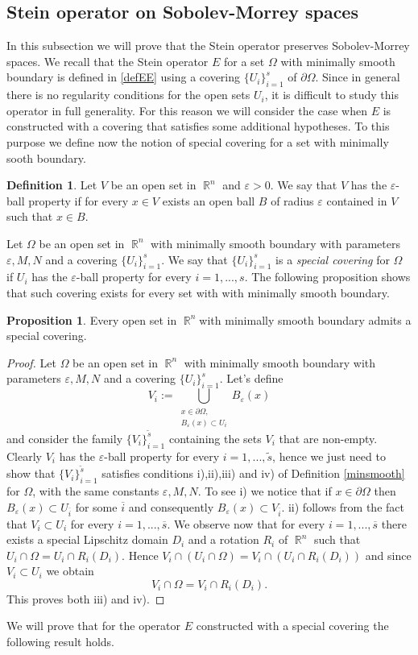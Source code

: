 \documentclass[12pt]{article}
\theoremstyle{definition}
\newtheorem{definition}{Definition}
\newtheorem{prop}{Proposition}
\DeclareMathOperator\rr{\mathbb{R}}
\begin{document}
\subsection{Stein operator on Sobolev-Morrey spaces}
In this subsection we will prove that the Stein operator preserves Sobolev-Morrey spaces. We recall that the Stein operator $E$ for a set $\Omega$ with minimally smooth boundary is defined in \eqref{defEE} using a covering $\{ U_i\}_{i=1}^s$ of $\partial \Omega$. Since in general there is no regularity conditions for the open sets $U_i$, it is difficult to study this operator in full generality. For this reason we will consider the case when $E$ is constructed with a covering that satisfies some additional hypotheses. To this purpose we define now the notion of special covering for a set with minimally sooth boundary.

\begin{definition}
Let $V$ be an open set in $\rr^n$ and $\varepsilon >0$. We say that $V$  has the $\varepsilon$-ball property if for every $ x\in V $ exists an open ball $B$ of radius $\varepsilon$ contained in $V$ such that $x \in B.$
\end{definition}
 Let $\Omega$ be an open set in $\rr^n$ with minimally smooth boundary with parameters $\varepsilon,M,N$ and a covering $\{ U_i\}_{i=1}^s.$ We say that $\{ U_i\}_{i=1}^s$ is a \textit{special covering} for $\Omega$ if $U_i$ has the $\varepsilon$-ball property for every $i=1,...,s.$ The following proposition shows that such covering exists for every set with with minimally smooth boundary.
 \begin{prop}
 Every open set in $\rr^n $with minimally smooth boundary admits a special covering.
 \end{prop}
 \begin{proof}
 Let $\Omega$ be an open set in $\rr^n$ with minimally smooth boundary with parameters $\varepsilon,M,N$ and a covering $\{ U_i\}_{i=1}^s.$ Let's define
\[V_i:=\bigcup_{\substack{x \in \partial\Omega, \\ B_\varepsilon(x) \subset U_i}}B_\varepsilon(x) \]
and consider the family $\{ V_i\}_{i=1}^{\widetilde s}$ containing the sets $V_i$ that are non-empty. Clearly $V_i$ has the $\varepsilon$-ball property for every $i=1,...,\widetilde s$, hence we just need to show that $\{ V_i\}_{i=1}^{\widetilde s}$ satisfies conditions i),ii),iii) and iv) of Definition \ref{minsmooth} for $\Omega$, with the same constants $\varepsilon,M,N$. To see i) we notice that if $x \in \partial \Omega$ then $B_\varepsilon(x) \subset U_{\overline i}$ for some $\overline i$ and consequently $B_\varepsilon(x) \subset V_{\overline i}.$ ii) follows from the fact that $V_i \subset U_i$ for every $i=1,...,\overline s$. We observe now that for every $i=1,...,\overline s$ there exists a special Lipschitz domain $D_i$ and a rotation $R_i$ of $\rr^n$ such that $U_i\cap \Omega=U_i \cap R_i(D_i).$ Hence $ V_i \cap ( U_i\cap \Omega)=V_i\cap (U_i \cap R_i(D_i))$ and since $V_i \subset U_i$ we obtain
\[ V_i \cap  \Omega=V_i\cap  R_i(D_i).\] This proves both iii) and iv).
\end{proof}
We will prove that for the operator $E$ constructed with a special covering the following result holds.
\end{document}
